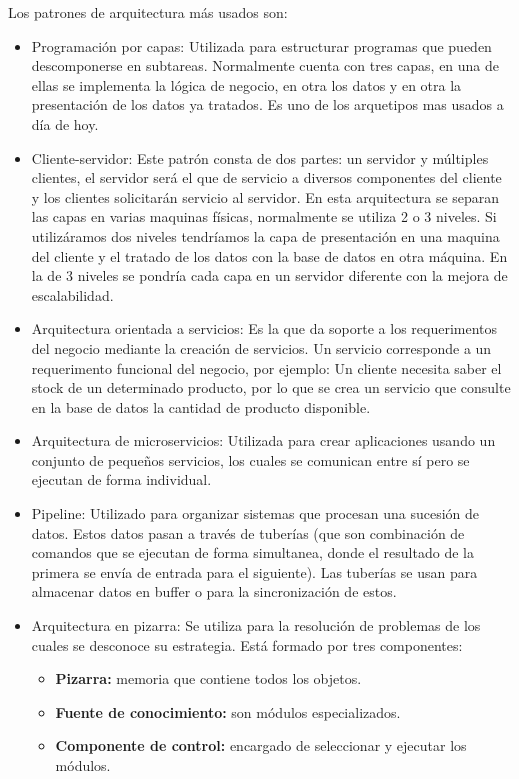 \documentclass[12pt]{report} %
\begin{document}
 Los patrones de arquitectura más usados son:
 	\begin{itemize}
 	\item Programación por capas: Utilizada para estructurar programas que pueden descomponerse en subtareas. Normalmente cuenta con tres capas, en una de ellas se implementa la lógica de negocio, en otra los datos y en otra la presentación de los datos ya tratados. Es uno de los arquetipos mas usados a día de hoy.
 	\item Cliente-servidor: Este patrón consta de dos partes: un servidor y múltiples clientes, el servidor será el que de servicio a diversos componentes del cliente y los clientes solicitarán servicio al servidor. En esta arquitectura se separan las capas en varias maquinas físicas, normalmente se utiliza 2 o 3 niveles. Si utilizáramos dos niveles tendríamos la capa de presentación en una maquina del cliente y el tratado de los datos con la base de datos en otra máquina. En la de 3 niveles se pondría cada capa en un servidor diferente con la mejora de escalabilidad.
 	\item Arquitectura orientada a servicios: Es la que da soporte a los requerimentos del negocio mediante la creación de servicios. Un servicio corresponde a un requerimento funcional del negocio, por ejemplo: 
 	Un cliente necesita saber el stock de un determinado producto, por lo que se crea un servicio que consulte en la base de datos la cantidad de producto disponible.
 	\item Arquitectura de microservicios: Utilizada para crear aplicaciones usando un conjunto de pequeños servicios, los cuales se comunican entre sí pero se ejecutan de forma individual.
 	\item Pipeline: Utilizado para organizar sistemas que procesan una sucesión de datos. Estos datos pasan a través de tuberías (que son combinación de comandos que se ejecutan de forma simultanea, donde el resultado de la primera se envía de entrada para el siguiente). Las tuberías se usan para almacenar datos en buffer o para la sincronización de estos.
 	\item Arquitectura en pizarra: Se utiliza para la resolución de problemas de los cuales se desconoce su estrategia. Está formado por tres componentes:
 	\begin{itemize}
 		\item \textbf{Pizarra:} memoria que contiene todos los objetos. 
 		\item \textbf{Fuente de conocimiento:} son módulos especializados. 
 		\item \textbf{Componente de control:} encargado de seleccionar y ejecutar los módulos.

\end{itemize}
\end{itemize}
\end{document}
